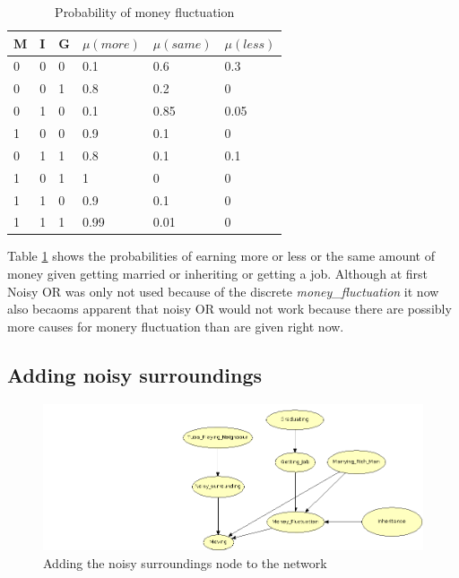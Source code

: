 \documentclass[12pt]{article} %
\begin{document}
\begin{centering}
    \begin{table}
        \begin{tabular}{|lll|lll|}
            \hline
            M & I & G & $\mu(more)$ & $\mu(same)$  & $\mu(less)$  \\ \hline
            0 & 0 & 0 &   0.1 & 0.6 & 0.3 \\
            0 & 0 & 1  &  0.8    & 0.2 & 0       \\ 
            0 & 1 & 0  &  0.1    & 0.85 & 0.05     \\
            1 & 0 & 0  &  0.9    & 0.1 & 0     \\                     
            0 & 1 & 1  &  0.8    & 0.1 & 0.1\\       
            1 & 0 & 1  &  1        & 0 & 0\\   
            1 & 1 & 0  &  0.9    & 0.1 & 0\\         
            1 & 1 & 1  &  0.99   & 0.01 & 0 \\
            \hline
        \end{tabular}
        \caption{Probability of money fluctuation}
        \label{ref:money}
    \end{table}
\end{centering}

\FloatBarrier
Table \ref{ref:money} shows the probabilities of earning more or less or the
same amount of money given getting married or inheriting or getting a job.
Although at first Noisy OR was only not used because of the discrete
\emph{money\_fluctuation} it now also becaoms apparent that noisy OR would not
work because there are possibly more causes for monery fluctuation than are
given right now.


\subsection{Adding noisy surroundings} 


\begin{figure}[h!]
    \centering
    \includegraphics[width=1\textwidth]{network2}
    \caption{Adding the noisy surroundings node to the network}
    \label{ref:noisy}
\end{figure}
\end{document}
